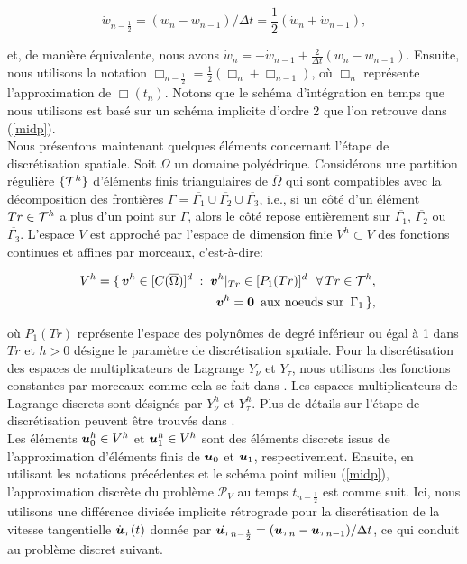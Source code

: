 \begin{equation}\label{midp}
\dot w_{n-\frac{1}{2}}=(w_{n}-w_{n-1})/\Delta t = \frac{1}{2}(\dot w_{n} + \dot w_{n-1}),
\end{equation}

et, de manière équivalente, nous avons $\dot w_{n}=-\dot
w_{n-1}+\frac{2}{\Delta t}(w_{n}-w_{n-1})$. Ensuite, nous utilisons la notation $\Box_{n-\frac{1}{2}} = \frac{1}{2}(\Box_n +
\Box_{n-1})$, où $\Box_n$ représente l'approximation de
$\Box(t_n)$. Notons que le schéma d'intégration en temps que nous utilisons est basé sur un schéma implicite d'ordre 2 que l'on retrouve dans (\ref{midp}).\\
Nous présentons maintenant quelques éléments concernant l'étape de discrétisation spatiale. Soit $\Omega$ un domaine polyédrique. Considérons une partition régulière $\{{\cal T}^h\}$ d'éléments finis triangulaires de $\overline {\Omega}$ qui sont compatibles avec la décomposition des frontières
$\Gamma=\overline{\Gamma_1}\cup\overline{\Gamma_2}\cup\overline{\Gamma_3}$, i.e., si un côté d'un élément $Tr\in{\cal T}^h$ a plus d'un point sur $ \Gamma $, alors le côté repose entièrement sur $\overline{\Gamma_1}$, $\overline{\Gamma_2}$ ou
$\overline{\Gamma_3}$. L'espace $V$ est approché par l'espace de dimension finie $V^h \subset V$ des fonctions continues et affines par morceaux, c'est-à-dire:

\begin{eqnarray}
&& \hspace*{-0.7cm}V^h=\{\,\bv^h\in [C(\overline{\Omega})]^d \; :
\; \bv^h|_{Tr}\in [P_1(Tr)]^d \,
\,\,\,   \forall\,Tr\in {\T}^h, \nonumber\\
 && \qquad \qquad \quad \bv^h=\bzero \,\,\, \hbox{aux noeuds sur}\,\,\, \Gamma_1\,\},\nonumber
\end{eqnarray}

où $P_1(Tr)$ représente l'espace des polynômes de degré inférieur ou égal à 1 dans $Tr$ et $h>0$ désigne le paramètre de discrétisation spatiale. Pour la discrétisation des espaces de multiplicateurs de Lagrange $Y_{\nu}$ et $Y_{\tau}$, nous utilisons des fonctions constantes par morceaux comme cela se fait dans \cite{barboteu2015hyperelastic}.
Les espaces multiplicateurs de Lagrange discrets sont désignés par $Y_{\nu}^h$ et $Y_{\tau}^h$. Plus de détails sur l'étape de discrétisation peuvent être trouvés dans \cite{khenous2006discretization,khenous2006hybrid,wriggers2004computational}.\\

Les éléments $\mbox{\boldmath{$u$}}^h_0 \in V^h$ et $\mbox{\boldmath{$u$}}^h_1 \in V^h$ sont des éléments discrets issus de l'approximation d'éléments finis de $\mbox{\boldmath{$u$}}_0$ et $\mbox{\boldmath{$u$}}_1$, respectivement. Ensuite, en utilisant les notations précédentes et le schéma point milieu (\ref{midp}), l'approximation discrète du problème ${{\mathcal P}}_V$ au temps $t_{n-\frac{1}{2}}$ est comme suit. Ici, nous utilisons une différence divisée implicite rétrograde pour la discrétisation de la vitesse tangentielle $\dot{\mbox{\boldmath{$u$}}}_\tau(t)$ donnée par $ \dot{{\mbox{\boldmath{$u$}}}_\tau}_{n-\frac{1}{2}} = ({\mbox{\boldmath{$u$}}_\tau}_n - {\mbox{\boldmath{$u$}}_\tau}_{n-1})/\Delta t$, ce qui conduit au problème discret suivant.

